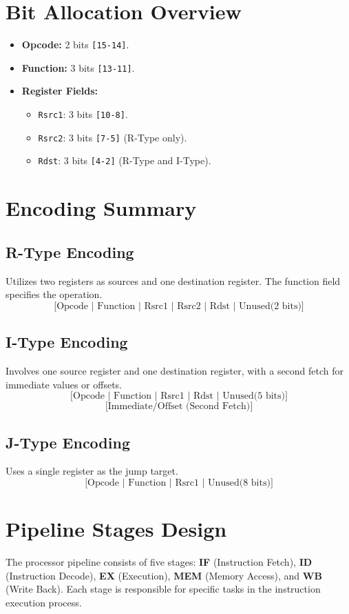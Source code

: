 \documentclass{report}
\begin{document}
\section*{Bit Allocation Overview}
\begin{itemize}
    \item \textbf{Opcode:} 2 bits \texttt{[15-14]}.
    \item \textbf{Function:} 3 bits \texttt{[13-11]}.
    \item \textbf{Register Fields:}
    \begin{itemize}
        \item \texttt{Rsrc1}: 3 bits \texttt{[10-8]}.
        \item \texttt{Rsrc2}: 3 bits \texttt{[7-5]} (R-Type only).
        \item \texttt{Rdst}: 3 bits \texttt{[4-2]} (R-Type and I-Type).
    \end{itemize}
\end{itemize}

\section*{Encoding Summary}
\subsection*{R-Type Encoding}
Utilizes two registers as sources and one destination register. The function field specifies the operation.
\[
\text{[Opcode | Function | Rsrc1 | Rsrc2 | Rdst | Unused(2 bits)]}
\]

\subsection*{I-Type Encoding}
Involves one source register and one destination register, with a second fetch for immediate values or offsets.
\[
\text{[Opcode | Function | Rsrc1 | Rdst | Unused(5 bits)]}
\]
\[
\text{[Immediate/Offset (Second Fetch)]}
\]

\subsection*{J-Type Encoding}
Uses a single register as the jump target.
\[
\text{[Opcode | Function | Rsrc1 | Unused(8 bits)]}
\]

\section*{Pipeline Stages Design}
The processor pipeline consists of five stages:
\textbf{IF} (Instruction Fetch),
\textbf{ID} (Instruction Decode),
\textbf{EX} (Execution),
\textbf{MEM} (Memory Access), and
\textbf{WB} (Write Back).
Each stage is responsible for specific tasks in the instruction execution process.
\end{document}
